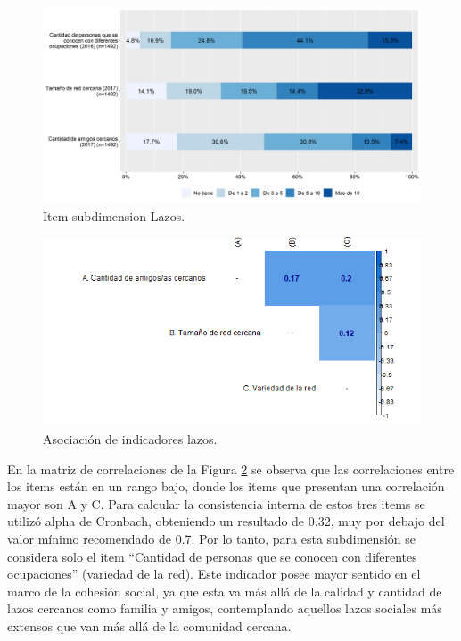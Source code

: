 \documentclass[
  12pt,
]{book}
\begin{document}
\begin{figure}[H]

{\centering \includegraphics[width=1\linewidth,height=1\textheight]{output/graphs/lazos} 

}

\caption{Item subdimension Lazos.}\label{fig:lazos}
\end{figure}

\begin{figure}[H]

{\centering \includegraphics[width=1\linewidth,height=1\textheight]{output/graphs/lazos_cor} 

}

\caption{Asociación de indicadores lazos.}\label{fig:lazos-cor}
\end{figure}

En la matriz de correlaciones de la Figura \ref{fig:lazos-cor} se observa que las correlaciones entre los items están en un rango bajo, donde los items que presentan una correlación mayor son A y C. Para calcular la consistencia interna de estos tres items se utilizó alpha de Cronbach, obteniendo un resultado de 0.32, muy por debajo del valor mínimo recomendado de 0.7. Por lo tanto, para esta subdimensión se considera solo el item ``Cantidad de personas que se conocen con diferentes ocupaciones'' (variedad de la red). Este indicador posee mayor sentido en el marco de la cohesión social, ya que esta va más allá de la calidad y cantidad de lazos cercanos como familia y amigos, contemplando aquellos lazos sociales más extensos que van más allá de la comunidad cercana.
\end{document}
